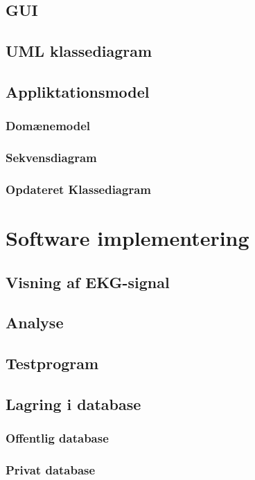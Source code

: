 \subsection{GUI}

\subsection{UML klassediagram}


\subsection{Appliktationsmodel}
 

\subsubsection{Domænemodel}

\subsubsection{Sekvensdiagram}

\subsubsection{Opdateret Klassediagram}

\section{Software implementering}
 
\subsection{Visning af EKG-signal}

\subsection{Analyse}

\subsection{Testprogram}

\subsection{Lagring i database} 

\subsubsection{Offentlig database}

\subsubsection{Privat database}







